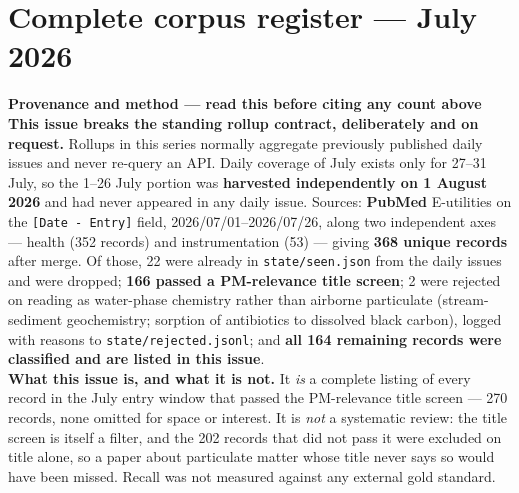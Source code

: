 \documentclass[10pt]{article}
\begin{document}
\vspace{3mm}



\clearpage

\section*{\sffamily\bfseries\color{Deep}Complete corpus register --- July 2026}
\vspace{-1.5mm}{\color{Coral}\rule{\linewidth}{1.1pt}}\vspace{2.5mm}



\vspace{4mm}
\begin{keybox}
{\sffamily\bfseries\footnotesize\color{Deep}Provenance and method --- read this before
citing any count above}\\[1.2mm]
{\fontsize{7.2}{8.8}\selectfont
\textbf{This issue breaks the standing rollup contract, deliberately and on request.}
Rollups in this series normally aggregate previously published daily issues and never
re-query an API. Daily coverage of July exists only for 27--31 July, so the 1--26 July
portion was \textbf{harvested independently on 1 August 2026} and had never appeared in
any daily issue. Sources: \textbf{PubMed} E-utilities on the \texttt{[Date - Entry]}
field, 2026/07/01--2026/07/26, along two independent axes --- health (352 records) and
instrumentation (53) --- giving \textbf{368 unique records} after merge. Of those, 22
were already in \texttt{state/seen.json} from the daily issues and were dropped;
\textbf{166 passed a PM-relevance title screen}; 2 were rejected on reading as water-phase
chemistry rather than airborne particulate (stream-sediment geochemistry; sorption of
antibiotics to dissolved black carbon), logged with reasons to
\texttt{state/rejected.jsonl}; and \textbf{all 164 remaining records were classified and
are listed in this issue}.
\\[1.0mm]
\textbf{What this issue is, and what it is not.} It \emph{is} a complete listing of every
record in the July entry window that passed the PM-relevance title screen --- 270 records,
none omitted for space or interest. It is \emph{not} a systematic review: the title screen
is itself a filter, and the 202 records that did not pass it were excluded on title alone,
so a paper about particulate matter whose title never says so would have been missed.
Recall was not measured against any external gold standard.
\\[1.0mm]
}
\end{keybox}
\end{document}
